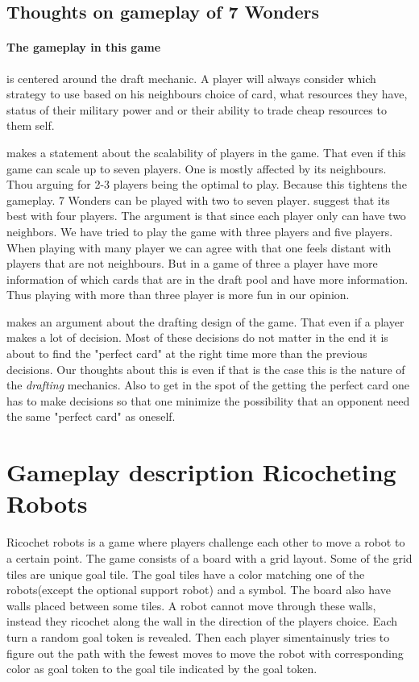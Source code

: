 \documentclass[a4paper]{article}
\begin{document}
\subsection{Thoughts on gameplay of 7 Wonders}
\label{sec:thoughtsGP7wond}
\paragraph{The gameplay in this game} is centered around the draft mechanic.
A player will always consider which strategy to use based on his neighbours choice of card, what resources they have, status of their military power and or their ability to trade cheap resources to them self. 

 makes a statement about the scalability of players in the game.
That even if this game can scale up to seven players. One is mostly affected by its neighbours.
Thou arguing for 2-3 players being the optimal to play.
Because this tightens the gameplay.
7 Wonders can be played with two to seven player.
 suggest that its best with four players.
 The argument is that since each player only can have two neighbors.
 We have tried to play the game with three players and five players.
 When playing with many player we can agree with \citeauthor{critical7wond} that one feels distant with players that are not neighbours.
 But in a game of three a player have more information of which cards that are in the draft pool and have more information.
 Thus playing with more than three player is more fun in our opinion.

 makes an argument about the drafting design of the game.
That even if a player makes a lot of decision.
Most of these decisions do not matter in the end it is about to find the "perfect card" at the right time more than the previous decisions.
Our thoughts about this is even if that is the case this is the nature of the \textit{drafting} mechanics.
Also to get in the spot of the getting the perfect card one has to make decisions so that one minimize the possibility that an opponent need the same "perfect card" as oneself.

\section{Gameplay description Ricocheting Robots}
Ricochet robots is a game where players challenge each other to move a robot to a certain point.
The game consists of a board with a grid layout. Some of the grid tiles are unique goal tile.
The goal tiles have a color matching one of the robots(except the optional support robot) and a symbol.
The board also have walls placed between some tiles. A robot cannot move through these walls, instead they ricochet along the wall in the direction of the players choice.
Each turn a random goal token is revealed.
Then each player simentainusly tries to figure out the path with the fewest moves to move the robot with corresponding color as goal token to the goal tile indicated by the goal token. 
\end{document}
